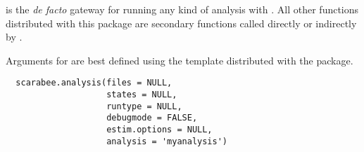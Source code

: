 %
\begin{Description}\relax
{} is the \emph{de facto} gateway for running any kind 
of analysis with . All other functions distributed with this
package are secondary functions called directly or indirectly by
.

Arguments for  are best defined using the template
distributed with the package.

\end{Description}
%
\begin{Usage}
\begin{verbatim}
  scarabee.analysis(files = NULL,
                    states = NULL,
                    runtype = NULL,
                    debugmode = FALSE,
                    estim.options = NULL,
                    analysis = 'myanalysis')
\end{verbatim}
\end{Usage}
%
